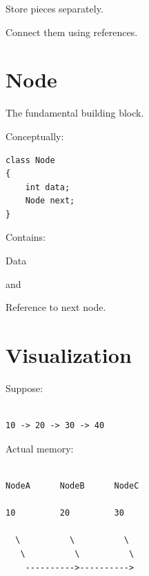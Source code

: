 \documentclass[11pt,a4paper]{book}
\begin{document}
Store pieces separately.


Connect them using references.


\section{Node}

The fundamental building block.


Conceptually:

\begin{verbatim} 
class Node
{
    int data;
    Node next;
}
\end{verbatim}


Contains:


Data


and


Reference to next node.


\section{Visualization}

Suppose:

\begin{verbatim}

10 -> 20 -> 30 -> 40

\end{verbatim}


Actual memory:

\begin{verbatim}

NodeA      NodeB      NodeC

10         20         30

  \          \          \
   \          \          \
    ---------->---------->

\end{verbatim}
\end{document}
